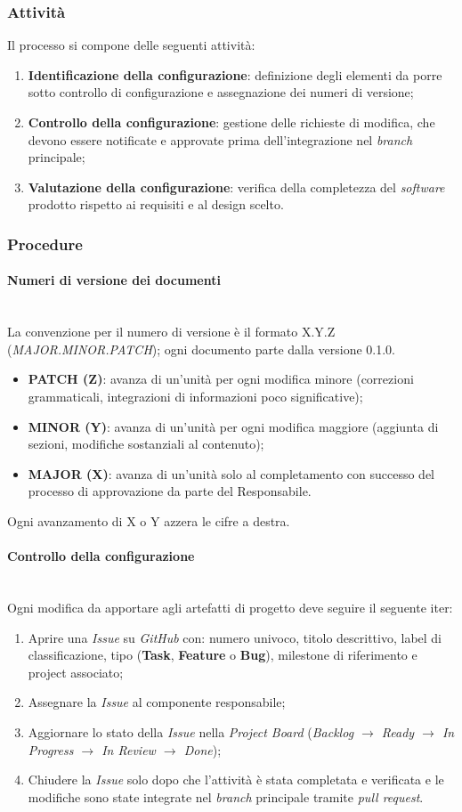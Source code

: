 \documentclass[10pt, letterpaper]{article}
\newcommand{\trisubsection}[1]{\paragraph{#1}\mbox{}\\}
\begin{document}
\subsubsection{Attività}
Il processo si compone delle seguenti attività:
\begin{enumerate}
    \item \textbf{Identificazione della configurazione}: definizione degli elementi da porre sotto controllo di configurazione e assegnazione dei numeri di versione;
    \item \textbf{Controllo della configurazione}: gestione delle richieste di modifica, che devono essere notificate e approvate prima dell'integrazione nel \textit{branch} principale;
    \item \textbf{Valutazione della configurazione}: verifica della completezza del \textit{software} prodotto rispetto ai requisiti e al design scelto.
\end{enumerate}

\subsubsection{Procedure}

\trisubsection{Numeri di versione dei documenti}
\label{sec:Versionamento}
La convenzione per il numero di versione è il formato X.Y.Z (\textit{MAJOR.MINOR.PATCH}); ogni documento parte dalla versione 0.1.0.
\begin{itemize}
    \item \textbf{PATCH (Z)}: avanza di un'unità per ogni modifica minore (correzioni grammaticali, integrazioni di informazioni poco significative);
    \item \textbf{MINOR (Y)}: avanza di un'unità per ogni modifica maggiore (aggiunta di sezioni, modifiche sostanziali al contenuto);
    \item \textbf{MAJOR (X)}: avanza di un'unità solo al completamento con successo del processo di approvazione da parte del Responsabile.
\end{itemize}
Ogni avanzamento di X o Y azzera le cifre a destra.

\trisubsection{Controllo della configurazione}
Ogni modifica da apportare agli artefatti di progetto deve seguire il seguente iter:
\begin{enumerate}
    \item Aprire una \textit{Issue} su \textit{GitHub} con: numero univoco, titolo descrittivo, label di classificazione, tipo (\textbf{Task}, \textbf{Feature} o \textbf{Bug}), milestone di riferimento e project associato;
    \item Assegnare la \textit{Issue} al componente responsabile;
    \item Aggiornare lo stato della \textit{Issue} nella \textit{Project Board} (\textit{Backlog $\to$ Ready $\to$ In Progress $\to$ In Review $\to$ Done});
    \item Chiudere la \textit{Issue} solo dopo che l'attività è stata completata e verificata e le modifiche sono state integrate nel \textit{branch} principale tramite \textit{pull request}.
\end{enumerate}
\end{document}
